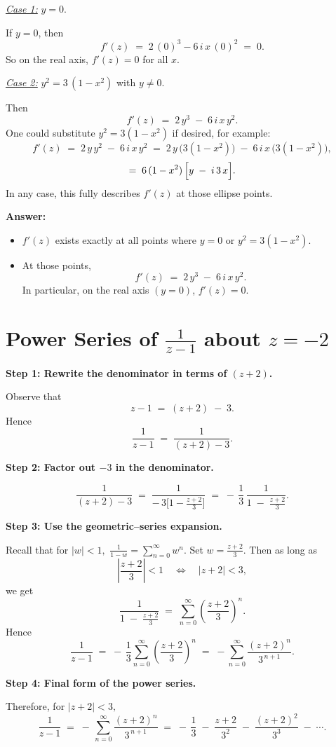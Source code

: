 \documentclass[12pt]{article}
\theoremstyle{definition} %
\theoremstyle{plain} %
\begin{document}
\smallskip
\noindent
\underline{\textit{Case 1:}} $y=0$.

If $y=0$, then
\[
f'(z)
\;=\;
2\,(0)^{3} - 6\,i\,x\,(0)^{2}
\;=\;
0.
\]
So on the real axis, $f'(z)=0$ for all $x$.

\smallskip
\noindent
\underline{\textit{Case 2:}} $y^{2} = 3\,(1 - x^{2})$ with $y \neq 0$.

Then
\[
f'(z)
\;=\;
2\,y^{3}
\;-\;
6\,i\,x\,y^{2}.
\]
One could substitute $y^{2} = 3(1 - x^{2})$ if desired, for example:
\[
f'(z)
\;=\;
2\,y \,y^{2}
\;-\;
6\,i\,x\,y^{2}
\;=\;
2\,y\,\bigl(3(1 - x^{2})\bigr)
\;-\;
6\,i\,x\,\bigl(3(1 - x^{2})\bigr),
\]
\[
=\;
6\,(1 - x^{2})\,\Bigl[y \;-\; i\,3\,x\Bigr].
\]
In any case, this fully describes $f'(z)$ at those ellipse points.

\bigskip

\noindent
\textbf{Answer:}
\begin{itemize}
\item $f'(z)$ exists exactly at all points where $y=0$ or $y^{2}=3(1-x^{2}).$
\item At those points,
\[
f'(z) \;=\; 2\,y^{3} \;-\; 6\,i\,x\,y^{2}.
\]
In particular, on the real axis $(y=0)$, $f'(z) = 0.$
\end{itemize}

\section*{Power Series of $\displaystyle \frac{1}{z - 1}$ about $z=-2$}

\noindent
\textbf{Step 1: Rewrite the denominator in terms of $(z+2)$.}

Observe that
\[
z - 1 
\;=\; (z + 2) \;-\; 3.
\]
Hence
\[
\frac{1}{z - 1}
\;=\;
\frac{1}{(z+2) - 3}.
\]

\medskip
\noindent
\textbf{Step 2: Factor out $-3$ in the denominator.}

\[
\frac{1}{(z+2) - 3}
\;=\;
\frac{1}{-\,3\bigl[1 - \tfrac{z+2}{3}\bigr]}
\;=\;
-\,\frac{1}{3}\,
\frac{1}{1 \;-\; \frac{z+2}{3}}.
\]

\medskip
\noindent
\textbf{Step 3: Use the geometric--series expansion.}

Recall that for $|w|<1,$
\(\displaystyle \frac{1}{1-w} = \sum_{n=0}^\infty w^n.\)
Set $w = \tfrac{z+2}{3}$. Then as long as
\[
\left|\frac{z+2}{3}\right| < 1
\quad\Longleftrightarrow\quad
|z+2| < 3,
\]
we get
\[
\frac{1}{1 \;-\; \frac{z+2}{3}}
\;=\;
\sum_{n=0}^\infty
\left(\frac{z+2}{3}\right)^n.
\]
Hence
\[
\frac{1}{z - 1}
\;=\;
-\,\frac{1}{3}
\sum_{n=0}^{\infty}
\left(\frac{z+2}{3}\right)^n
\;=\;
-\sum_{n=0}^\infty
\frac{(z+2)^n}{3^{\,n+1}}.
\]

\medskip
\noindent
\textbf{Step 4: Final form of the power series.}

Therefore, for $|z+2|<3,$
\[
\frac{1}{z-1}
\;=\;
-\,\sum_{n=0}^\infty 
\frac{(z+2)^n}{3^{\,n+1}}
\;=\;
-\,\frac{1}{3}
\;-\;\frac{z+2}{3^2}
\;-\;\frac{(z+2)^2}{3^3}
\;-\;\cdots.
\]
\end{document}
